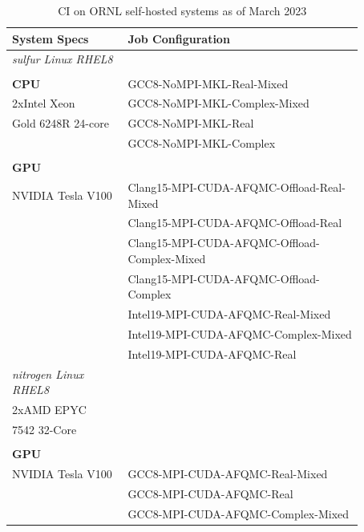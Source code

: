 \begin{table}[!h]
\centering
\caption{CI on ORNL self-hosted systems as of March 2023}
\begin{tabular}{||p{0.29\linewidth} | p{0.58\linewidth}||}
\hline
System Specs      & Job Configuration  \\
\hline \hline 
\textit{sulfur Linux RHEL8}     &                                           \\
                    &                                           \\
\textbf{CPU}        & GCC8-NoMPI-MKL-Real-Mixed                 \\
2xIntel Xeon        & GCC8-NoMPI-MKL-Complex-Mixed              \\
Gold 6248R 24-core  & GCC8-NoMPI-MKL-Real                       \\
                    & GCC8-NoMPI-MKL-Complex                    \\
                    &                                           \\
\textbf{GPU}        &                                           \\
NVIDIA Tesla V100   & Clang15-MPI-CUDA-AFQMC-Offload-Real-Mixed \\
                    & Clang15-MPI-CUDA-AFQMC-Offload-Real       \\
                    & Clang15-MPI-CUDA-AFQMC-Offload-Complex-Mixed  \\
                    & Clang15-MPI-CUDA-AFQMC-Offload-Complex    \\
                    & Intel19-MPI-CUDA-AFQMC-Real-Mixed         \\
                    & Intel19-MPI-CUDA-AFQMC-Complex-Mixed      \\
                    & Intel19-MPI-CUDA-AFQMC-Real               \\
\hline
\textit{nitrogen Linux RHEL8}  &                  \\
2xAMD EPYC          & \\
7542 32-Core        & \\
                    &                                \\
\textbf{GPU}        &                                \\
NVIDIA Tesla V100   & GCC8-MPI-CUDA-AFQMC-Real-Mixed \\
                    & GCC8-MPI-CUDA-AFQMC-Real  \\
                    & GCC8-MPI-CUDA-AFQMC-Complex-Mixed \\

\end{tabular}
\end{table}
